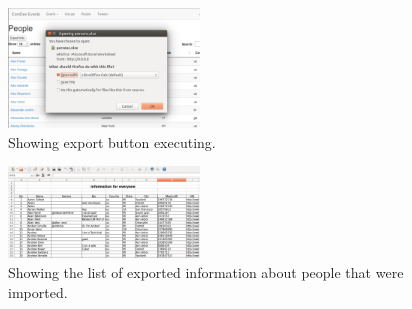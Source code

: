 \documentclass[letterpaper,10pt,onecolumn]{IEEEtran} %
\begin{document}
\begin{figure}[htp]
  \begin{center}
  
  \includegraphics[width=2in]{exporting1}
  \centering
  \caption{Showing export button executing. }

  \end{center}
\end{figure}

\begin{figure}[htp]
  \begin{center}
  
  \includegraphics[width=2in]{exporting2}
  \centering
  \caption{Showing the list of exported information about people that were imported. }

  \end{center}
\end{figure}
\end{document}
